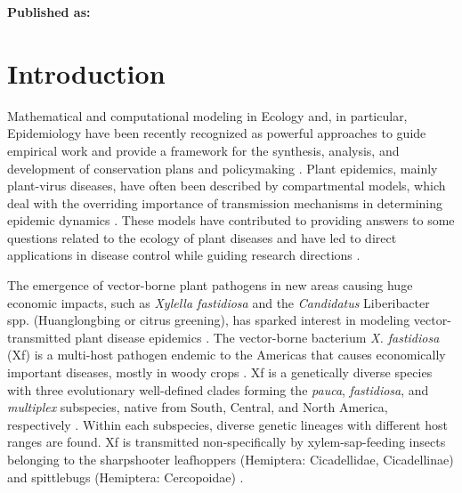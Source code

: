 




\textbf{Published as:}

\vspace{0.5cm}


\newpage
\section{Introduction}

Mathematical and computational modeling in Ecology and, in particular,
Epidemiology have been recently recognized as powerful approaches to guide
empirical work and provide a framework for the synthesis, analysis, and
development of conservation plans and policymaking
\cite{levin1992mathematics,Murray_book,sarkar2006biodiversity,Chew2014}.
Plant epidemics, mainly plant-virus diseases, have often been described by
compartmental models, which deal with the overriding importance of transmission
mechanisms in determining epidemic dynamics
\cite{Jeger1998,Jeger2004,Madden2000}. These models have contributed to
providing answers to some questions related to the ecology of plant diseases
and have led to direct applications in disease control while guiding research
directions \cite{Jeger2019}.

The emergence of vector-borne plant pathogens in new areas causing huge
economic impacts, such as \textit{Xylella fastidiosa} and the
\textit{Candidatus} Liberibacter spp. (Huanglongbing or citrus greening), has
sparked interest in modeling vector-transmitted plant disease epidemics
\cite{chiyaka2012modeling,Jeger2019}. The vector-borne bacterium \textit{X.
    fastidiosa} (Xf) is a multi-host pathogen endemic to the Americas that
causes
economically important diseases, mostly in woody crops \cite{Hopkins2002}. Xf
is a genetically diverse species with three evolutionary well-defined clades
forming the \textit{pauca}, \textit{fastidiosa}, and \textit{multiplex}
subspecies, native from South, Central, and North America, respectively
\cite{Vanhove2019}. Within each subspecies, diverse genetic lineages
with different host ranges are found. Xf is transmitted non-specifically by
xylem-sap-feeding insects belonging to the sharpshooter leafhoppers (Hemiptera:
Cicadellidae, Cicadellinae) and spittlebugs (Hemiptera: Cercopoidae)
\cite{Redak2004}.

